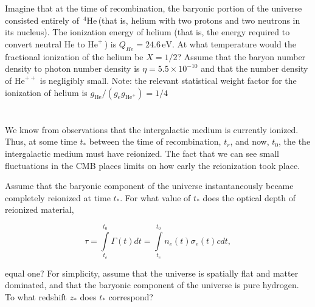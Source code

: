 \documentclass[12pt]{article}
\begin{document}
\newcommand{\mpc}{\mathrm{Mpc}}
\newcommand{\km}{\mathrm{km}}
\newcommand{\solarmass}{M_{\odot}}
\newcommand{\s}{\mathrm{sec}}
\newcommand{\is}{\sec^{-1}}
\newcommand{\ikm}{\km^{-1}}
\newcommand{\impc}{\mpc^{-1}}

\newcommand{\reh}{r_\mathrm{eh}}
\newcommand{\rh}{t_\mathrm{h}}
\newcommand{\el}{\epsilon_\Lambda}

\newcommand{\hea}{\(\,^4\mathrm{He}\,\)}
\newcommand{\heplus}{\(\mathrm{He}^+\,\)}

\newcommand{\ev}{\,\mathrm{eV}}

\section{}

Imagine that at the time of recombination, the baryonic portion of the universe consisted entirely of \hea (that is, helium with two protons and two neutrons in its nucleus). The ionization energy of helium (that is, the energy required to convert neutral He to \heplus) is \(Q_{He} = 24.6 \,\mathrm{eV}\). At what temperature would the fractional ionization of the helium be \(X = 1/2\)? Assume that the baryon number density to photon number density  is \(\eta = 5.5 \times 10^{-10}\) and that the number density of \(\mathrm{He}^{++}\) is negligibly small. Note: the relevant statistical weight factor for the ionization of helium is \(g_{\mathrm{He}}/(g_e g_{\mathrm{He}^+}) = 1/4\)

\section{}

We know from observations that the intergalactic medium is currently ionized. Thus, at some time \(t_{*}\) between the time of recombination, \(t_{r}\), and now, \(t_0\), the the intergalactic medium must have reionized. The fact that we can see small fluctuations in the CMB places limits on how early the reionization took place.

Assume that the baryonic component of the universe instantaneously became completely reionized at time \(t_*\). For what value of \(t_*\) does the optical depth of reionized material,

\[ \tau = \int\limits_{t_e}^{t_0}\Gamma (t)dt = \int\limits_{t_e}^{t_0} n_e(t)\sigma _e(t)cdt,
\]

equal one? For simplicity, assume that the universe is spatially flat and matter dominated, and that the baryonic component of the universe is pure hydrogen. To what redshift \(z_*\) does \(t_*\) correspond?
\end{document}
